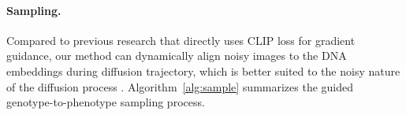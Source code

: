 \vspace{-3mm}
\paragraph{Sampling.} Compared to previous research \cite{kim2022diffusionclip} that directly uses CLIP loss for gradient guidance, our method can dynamically align noisy images to the DNA embeddings during diffusion trajectory, which is better suited to the noisy nature of the diffusion process \cite{nichol2021glide}.
Algorithm~\ref{alg:sample} summarizes the guided genotype-to-phenotype sampling process.


